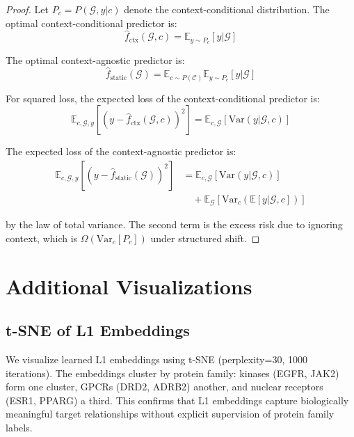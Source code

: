 \documentclass{article}
\begin{document}
\begin{proof}
Let $P_c = P(\mathcal{G}, y | c)$ denote the context-conditional distribution. The optimal context-conditional predictor is:
\begin{equation}
    \hat{f}_{\text{ctx}}(\mathcal{G}, c) = \mathbb{E}_{y \sim P_c}[y | \mathcal{G}]
\end{equation}

The optimal context-agnostic predictor is:
\begin{equation}
    \hat{f}_{\text{static}}(\mathcal{G}) = \mathbb{E}_{c \sim P(\mathcal{C})} \mathbb{E}_{y \sim P_c}[y | \mathcal{G}]
\end{equation}

For squared loss, the expected loss of the context-conditional predictor is:
\begin{equation}
    \mathbb{E}_{c, \mathcal{G}, y}[(y - \hat{f}_{\text{ctx}}(\mathcal{G}, c))^2] = \mathbb{E}_{c, \mathcal{G}}[\text{Var}(y | \mathcal{G}, c)]
\end{equation}

The expected loss of the context-agnostic predictor is:
\begin{align}
    \mathbb{E}_{c, \mathcal{G}, y}[(y - \hat{f}_{\text{static}}(\mathcal{G}))^2] &= \mathbb{E}_{c, \mathcal{G}}[\text{Var}(y | \mathcal{G}, c)] \\
    &\quad + \mathbb{E}_{\mathcal{G}}[\text{Var}_c(\mathbb{E}[y | \mathcal{G}, c])]
\end{align}

by the law of total variance. The second term is the excess risk due to ignoring context, which is $\Omega(\text{Var}_c[P_c])$ under structured shift.
\end{proof}

\section{Additional Visualizations}
\label{app:visualizations}

\subsection{t-SNE of L1 Embeddings}

We visualize learned L1 embeddings using t-SNE (perplexity=30, 1000 iterations). The embeddings cluster by protein family: kinases (EGFR, JAK2) form one cluster, GPCRs (DRD2, ADRB2) another, and nuclear receptors (ESR1, PPARG) a third. This confirms that L1 embeddings capture biologically meaningful target relationships without explicit supervision of protein family labels.
\end{document}
